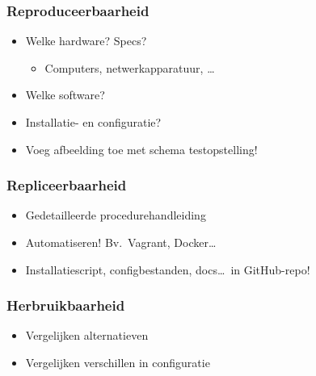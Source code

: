 \documentclass[aspectratio=169]{beamer}
\begin{document}
\begin{frame}
  \frametitle{Reproduceerbaarheid}


  \bigskip

  \begin{itemize}
    \item Welke hardware? Specs?
          \begin{itemize}
            \item Computers, netwerkapparatuur, \ldots
          \end{itemize}
    \item Welke software?
    \item Installatie- en configuratie?
    \item Voeg afbeelding toe met schema testopstelling!
  \end{itemize}

\end{frame}

\begin{frame}
  \frametitle{Repliceerbaarheid}


  \bigskip

  \begin{itemize}
    \item Gedetailleerde procedurehandleiding
    \item Automatiseren! Bv.\ Vagrant, Docker\ldots
    \item Installatiescript, configbestanden, docs\ldots\ in GitHub-repo!
  \end{itemize}

\end{frame}

\begin{frame}
  \frametitle{Herbruikbaarheid}


  \bigskip

  \begin{itemize}
    \item Vergelijken alternatieven
    \item Vergelijken verschillen in configuratie
  \end{itemize}

\end{frame}
\end{document}
